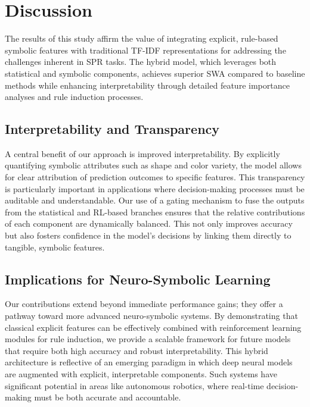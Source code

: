 \documentclass{article}
\begin{document}
\section{Discussion}
The results of this study affirm the value of integrating explicit, rule-based symbolic features with traditional TF-IDF representations for addressing the challenges inherent in SPR tasks. The hybrid model, which leverages both statistical and symbolic components, achieves superior SWA compared to baseline methods while enhancing interpretability through detailed feature importance analyses and rule induction processes.

\subsection{Interpretability and Transparency}
A central benefit of our approach is improved interpretability. By explicitly quantifying symbolic attributes such as shape and color variety, the model allows for clear attribution of prediction outcomes to specific features. This transparency is particularly important in applications where decision-making processes must be auditable and understandable. Our use of a gating mechanism to fuse the outputs from the statistical and RL-based branches ensures that the relative contributions of each component are dynamically balanced. This not only improves accuracy but also fosters confidence in the model's decisions by linking them directly to tangible, symbolic features.

\subsection{Implications for Neuro-Symbolic Learning}
Our contributions extend beyond immediate performance gains; they offer a pathway toward more advanced neuro-symbolic systems. By demonstrating that classical explicit features can be effectively combined with reinforcement learning modules for rule induction, we provide a scalable framework for future models that require both high accuracy and robust interpretability. This hybrid architecture is reflective of an emerging paradigm in which deep neural models are augmented with explicit, interpretable components. Such systems have significant potential in areas like autonomous robotics, where real-time decision-making must be both accurate and accountable.
\end{document}

